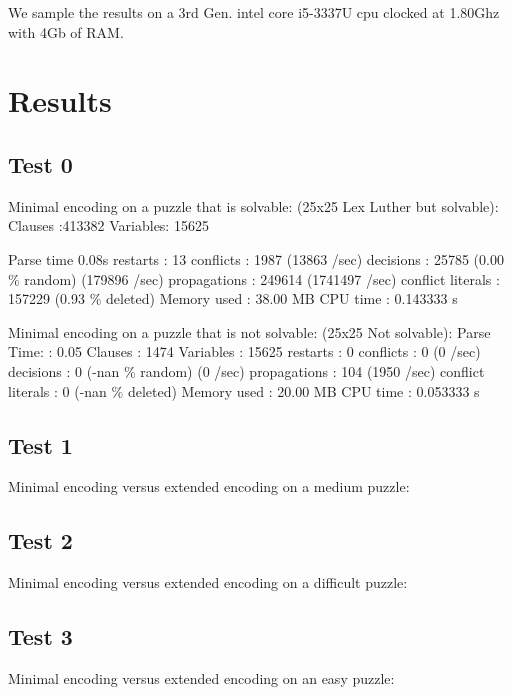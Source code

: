 \documentclass[conference,draftclsnofoot]{IEEEtran}
\begin{document}
We sample the results on a 3rd Gen. intel core i5-3337U cpu clocked at 1.80Ghz
with 4Gb of RAM.

\section{Results}

\subsection{Test 0}



Minimal encoding on a puzzle that is solvable:
(25x25 Lex Luther but solvable):
Clauses  :413382
Variables: 15625

Parse time 0.08s
restarts              : 13
conflicts             : 1987           (13863 /sec)
decisions             : 25785          (0.00 \% random) (179896 /sec)
propagations          : 249614         (1741497 /sec)
conflict literals     : 157229         (0.93 \% deleted)
Memory used           : 38.00 MB
CPU time              : 0.143333 s

Minimal encoding on a puzzle that is not solvable:
(25x25 Not solvable):
Parse Time:		: 0.05
Clauses		      : 1474 
Variables	      : 15625
restarts              : 0
conflicts             : 0              (0 /sec)
decisions             : 0              (-nan \% random) (0 /sec)
propagations          : 104            (1950 /sec)
conflict literals     : 0              (-nan \% deleted)
Memory used           : 20.00 MB
CPU time              : 0.053333 s

\subsection{Test 1}
Minimal encoding versus extended encoding on a medium puzzle:

\subsection{Test 2}
Minimal encoding versus extended encoding on a difficult puzzle:


\subsection{Test 3}
Minimal encoding versus extended encoding on an easy puzzle:
\end{document}

